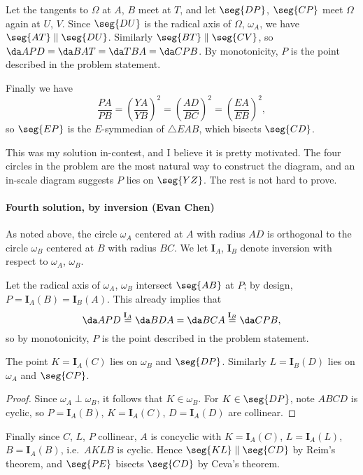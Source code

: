 Let the tangents to $\Omega$ at $A$, $B$ meet at $T$, and let $\seg{DP}$, $\seg{CP}$ meet $\Omega$ again at $U$, $V$. Since $\seg{DU}$ is the radical axis of $\Omega$, $\omega_A$, we have $\seg{AT}\parallel\seg{DU}$. Similarly $\seg{BT}\parallel\seg{CV}$, so $\da APD=\da BAT=\da TBA=\da CPB$. By monotonicity, $P$ is the point described in the problem statement.

Finally we have \[\frac{PA}{PB}=\left(\frac{YA}{YB}\right)^2=\left(\frac{AD}{BC}\right)^2=\left(\frac{EA}{EB}\right)^2,\]
so $\seg{EP}$ is the $E$-symmedian of $\triangle EAB$, which bisects $\seg{CD}$.
\begin{remark}
    This was my solution in-contest, and I believe it is pretty motivated. The four circles in the problem are the most natural way to construct the diagram, and an in-scale diagram suggests $P$ lies on $\seg{YZ}$. The rest is not hard to prove.
\end{remark}

\paragraph{Fourth solution, by inversion (Evan Chen)} As noted above, the circle $\omega_A$ centered at $A$ with radius $AD$ is orthogonal to the circle $\omega_B$ centered at $B$ with radius $BC$. We let $\mathbf I_A$, $\mathbf I_B$ denote inversion with respect to $\omega_A$, $\omega_B$.

Let the radical axis of $\omega_A$, $\omega_B$ intersect $\seg{AB}$ at $P$; by design, $P=\mathbf I_A(B)=\mathbf I_B(A)$. This already implies that \[\da APD\stackrel{\mathbf I_A}=\da BDA=\da BCA\stackrel{\mathbf I_B}=\da CPB,\]
so by monotonicity, $P$ is the point described in the problem statement.
\begin{claim*}
    The point $K=\mathbf I_A(C)$ lies on $\omega_B$ and $\seg{DP}$. Similarly $L=\mathbf I_B(D)$ lies on $\omega_A$ and $\seg{CP}$.
\end{claim*}
\begin{proof}
    Since $\omega_A\perp\omega_B$, it follows that $K\in\omega_B$. For $K\in\seg{DP}$, note $ABCD$ is cyclic, so $P=\mathbf I_A(B)$, $K=\mathbf I_A(C)$, $D=\mathbf I_A(D)$ are collinear.
\end{proof}

Finally since $C$, $L$, $P$ collinear, $A$ is concyclic with $K=\mathbf I_A(C)$, $L=\mathbf I_A(L)$, $B=\mathbf I_A(B)$, i.e.\ $AKLB$ is cyclic. Hence $\seg{KL}\parallel\seg{CD}$ by Reim's theorem, and $\seg{PE}$ bisects $\seg{CD}$ by Ceva's theorem.


